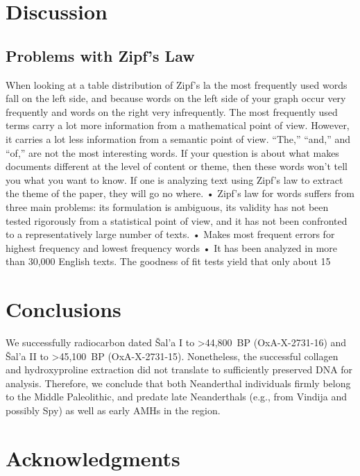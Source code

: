 \documentclass[a4paper,10pt]{article}
\begin{document}
\section{Discussion}

\subsection{Problems with Zipf's Law}

When looking at a table distribution of Zipf’s la the most frequently used words fall on the left side, and because words on the left side of your graph occur very frequently and words on the right very infrequently. The most frequently used terms carry a lot more information from a mathematical point of view. However, it carries a lot less information from a semantic point of view. “The,” “and,” and “of,” are not the most interesting words. If your question is about what makes documents different at the level of content or theme, then these words won’t tell you what you want to know. If one is analyzing text using Zipf’s law to extract the theme of the paper, they will go no where.
• Zipf's law for words suffers from three main problems: its formulation is ambiguous, its validity has not been tested rigorously from a statistical point of view, and it has not been confronted to a representatively large number of texts.
• Makes most frequent errors for highest frequency and lowest frequency words 
• It has been analyzed in more than 30,000 English texts. The goodness of fit tests yield that only about 15%


\section{Conclusions}

We successfully radiocarbon dated Šal'a I to >44,800~BP (OxA-X-2731-16) and Šal'a II to >45,100~BP (OxA-X-2731-15). Nonetheless, the successful collagen and hydroxyproline extraction did not translate to sufficiently preserved DNA for analysis. Therefore, we conclude that both Neanderthal individuals firmly belong to the Middle Paleolithic, and predate late Neanderthals (e.g., from Vindija and possibly Spy) as well as early AMHs in the region.


\section*{Acknowledgments}
\end{document}
